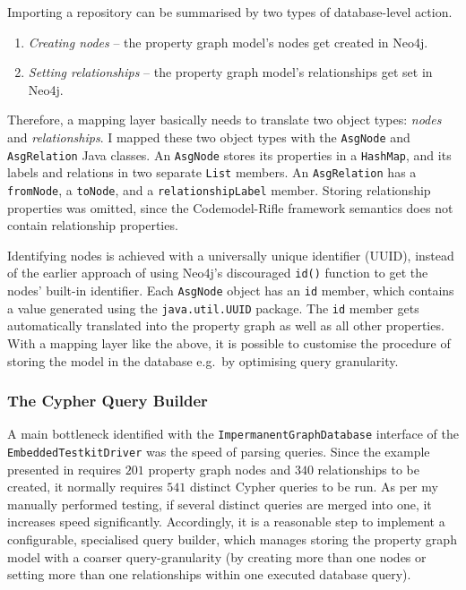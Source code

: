 Importing a repository can be summarised by two types of database-level action.

\begin{enumerate}
\item \emph{Creating nodes} – the property graph model's nodes get created in Neo4j.
\item \emph{Setting relationships} – the property graph model's relationships get set in Neo4j.
\end{enumerate}

Therefore, a mapping layer basically needs to translate two object types: \emph{nodes} and \emph{relationships}. I mapped these two object types with the \lstinline{AsgNode} and \lstinline{AsgRelation} Java classes. An \lstinline{AsgNode} stores its properties in a \lstinline{HashMap}, and its labels and relations in two separate \lstinline{List} members. An \lstinline{AsgRelation} has a \lstinline{fromNode}, a \lstinline{toNode}, and a \lstinline{relationshipLabel} member. Storing relationship properties was omitted, since the Codemodel-Rifle framework semantics does not contain relationship properties.

Identifying nodes is achieved with a universally unique identifier (UUID), instead of the earlier approach of using Neo4j's discouraged \lstinline{id()} function to get the nodes' built-in identifier. Each \lstinline{AsgNode} object has an \lstinline{id} member, which contains a value generated using the \lstinline{java.util.UUID} package. The \lstinline{id} member gets automatically translated into the property graph as well as all other properties. With a mapping layer like the above, it is possible to customise the procedure of storing the model in the database e.g.\ by optimising query granularity.


\subsubsection{The Cypher Query Builder}

A main bottleneck identified with the \lstinline{ImpermanentGraphDatabase} interface of the \lstinline{EmbeddedTestkitDriver} was the speed of parsing queries. Since the example presented in  requires $201$ property graph nodes and $340$ relationships to be created, it normally requires $541$ distinct Cypher queries to be run. As per my manually performed testing, if several distinct queries are merged into one, it increases speed significantly. Accordingly, it is a reasonable step to implement a configurable, specialised query builder, which manages storing the property graph model with a coarser query-granularity (by creating more than one nodes or setting more than one relationships within one executed database query).

